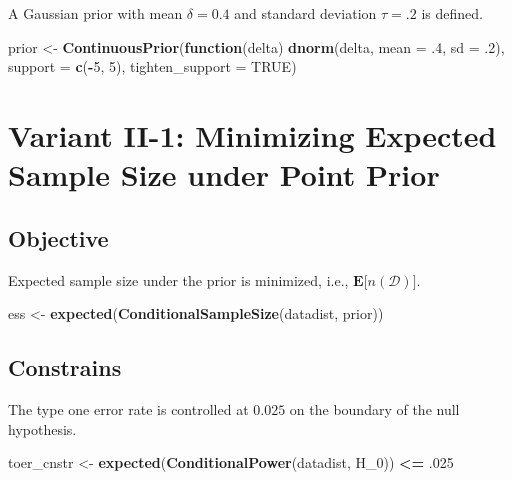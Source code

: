 \documentclass[]{book}
\newenvironment{Shaded}{\begin{snugshade}}{\end{snugshade}}
\newcommand{\ControlFlowTok}[1]{\textcolor[rgb]{0.13,0.29,0.53}{\textbf{#1}}}
\newcommand{\DataTypeTok}[1]{\textcolor[rgb]{0.13,0.29,0.53}{#1}}
\newcommand{\DecValTok}[1]{\textcolor[rgb]{0.00,0.00,0.81}{#1}}
\newcommand{\FloatTok}[1]{\textcolor[rgb]{0.00,0.00,0.81}{#1}}
\newcommand{\KeywordTok}[1]{\textcolor[rgb]{0.13,0.29,0.53}{\textbf{#1}}}
\newcommand{\NormalTok}[1]{#1}
\newcommand{\OperatorTok}[1]{\textcolor[rgb]{0.81,0.36,0.00}{\textbf{#1}}}
\newcommand{\OtherTok}[1]{\textcolor[rgb]{0.56,0.35,0.01}{#1}}
\newcommand{\StringTok}[1]{\textcolor[rgb]{0.31,0.60,0.02}{#1}}
\begin{document}
A Gaussian prior with mean \(\delta = 0.4\) and standard deviation
\(\tau = .2\) is defined.

\begin{Shaded}
\begin{Highlighting}[]
\NormalTok{prior <-}\StringTok{ }\KeywordTok{ContinuousPrior}\NormalTok{(}\ControlFlowTok{function}\NormalTok{(delta) }\KeywordTok{dnorm}\NormalTok{(delta, }\DataTypeTok{mean =} \FloatTok{.4}\NormalTok{, }\DataTypeTok{sd =} \FloatTok{.2}\NormalTok{),}
                         \DataTypeTok{support =} \KeywordTok{c}\NormalTok{(}\OperatorTok{-}\DecValTok{5}\NormalTok{, }\DecValTok{5}\NormalTok{),}
                         \DataTypeTok{tighten_support =} \OtherTok{TRUE}\NormalTok{)}
\end{Highlighting}
\end{Shaded}

\hypertarget{variantII_1}{%
\section{Variant II-1: Minimizing Expected Sample Size under Point Prior}\label{variantII_1}}

\hypertarget{objective-3}{%
\subsection{Objective}\label{objective-3}}

Expected sample size under the prior is minimized, i.e.,
\(\boldsymbol{E}\big[n(\mathcal{D})\big]\).

\begin{Shaded}
\begin{Highlighting}[]
\NormalTok{ess <-}\StringTok{ }\KeywordTok{expected}\NormalTok{(}\KeywordTok{ConditionalSampleSize}\NormalTok{(datadist, prior))}
\end{Highlighting}
\end{Shaded}

\hypertarget{constrains-3}{%
\subsection{Constrains}\label{constrains-3}}

The type one error rate is controlled at \(0.025\) on the boundary of the
null hypothesis.

\begin{Shaded}
\begin{Highlighting}[]
\NormalTok{toer_cnstr <-}\StringTok{ }\KeywordTok{expected}\NormalTok{(}\KeywordTok{ConditionalPower}\NormalTok{(datadist, H_}\DecValTok{0}\NormalTok{)) }\OperatorTok{<=}\StringTok{ }\FloatTok{.025}
\end{Highlighting}
\end{Shaded}
\end{document}
